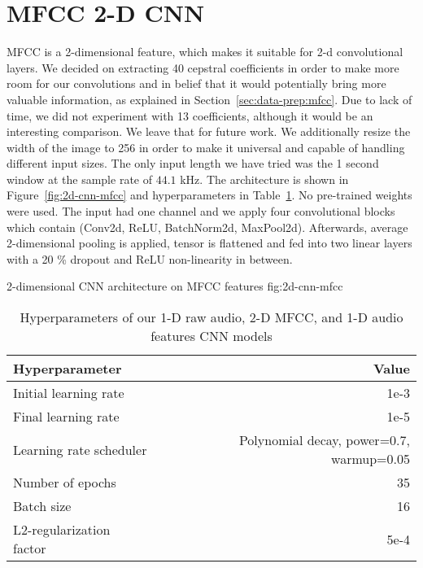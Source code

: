 \section{MFCC 2-D CNN}
\label{sec:mfcc-2d-cnn}
MFCC is a 2-dimensional feature, which makes it suitable for 2-d convolutional layers. We decided on extracting 40 cepstral coefficients in order to make more room for our convolutions and in belief that it would potentially bring more valuable information, as explained in Section~\ref{sec:data-prep:mfcc}. Due to lack of time, we did not experiment with 13 coefficients, although it would be an interesting comparison. We leave that for future work. We additionally resize the width of the image to 256 in order to make it universal and capable of handling different input sizes. The only input length we have tried was the 1 second window at the sample rate of $44.1$ kHz. The architecture is shown in Figure~\ref{fig:2d-cnn-mfcc} and hyperparameters in Table~\ref{tab:2d-conv-mfcc-hyperparam}. No pre-trained weights were used. The input had one channel and we apply four convolutional blocks which contain (Conv2d, ReLU, BatchNorm2d, MaxPool2d). Afterwards, average 2-dimensional pooling is applied, tensor is flattened and fed into two linear layers with a 20 \% dropout and ReLU non-linearity in between. 

	        {2-dimensional CNN architecture on MFCC features}
                {fig:2d-cnn-mfcc}

\begin{table}[H]
\centering
\begin{tabular}{l r}
Hyperparameter           & Value   \\ \hline
Initial learning rate    & 1e-3                        \\
Final learning rate      & 1e-5                        \\
Learning rate scheduler  & Polynomial decay, power=0.7, warmup=0.05 \\
Number of epochs         & 35                          \\
Batch size               & 16                          \\
L2-regularization factor & 5e-4                       
\end{tabular}
\caption{Hyperparameters of our 1-D raw audio, 2-D MFCC, and 1-D audio features CNN models}
\label{tab:2d-conv-mfcc-hyperparam}
\end{table}

%    

